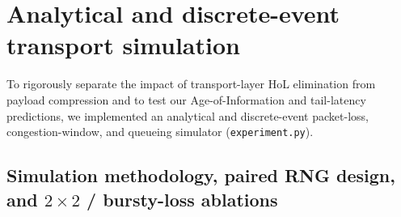 \documentclass[11pt]{article}
\begin{document}
\section{Analytical and discrete-event transport simulation}\label{sec:experiments}

To rigorously separate the impact of transport-layer HoL elimination from payload compression and to test our Age-of-Information and tail-latency predictions, we implemented an analytical and discrete-event packet-loss, congestion-window, and queueing simulator (\texttt{experiment.\linebreak[0]py}).

\subsection{Simulation methodology, paired RNG design, and $2\times 2$ / bursty-loss ablations}
\end{document}
